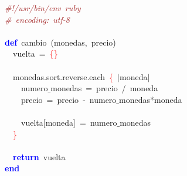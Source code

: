 \noindent
\mbox{}\textit{\textcolor{Brown}{\#!/usr/bin/env\ ruby}} \\
\mbox{}\textit{\textcolor{Brown}{\#\ encoding:\ utf-8}} \\
\mbox{} \\
\mbox{}\textbf{\textcolor{Blue}{def}}\ cambio\ \textcolor{BrickRed}{(}monedas\textcolor{BrickRed}{,}\ precio\textcolor{BrickRed}{)} \\
\mbox{}\ \ vuelta\ \textcolor{BrickRed}{=}\ \textcolor{Red}{\{\}} \\
\mbox{} \\
\mbox{}\ \ monedas\textcolor{BrickRed}{.}sort\textcolor{BrickRed}{.}reverse\textcolor{BrickRed}{.}each\ \textcolor{Red}{\{}\ \textcolor{BrickRed}{$|$}moneda\textcolor{BrickRed}{$|$} \\
\mbox{}\ \ \ \ numero$\_$monedas\ \textcolor{BrickRed}{=}\ precio\ \textcolor{BrickRed}{/}\ moneda \\
\mbox{}\ \ \ \ precio\ \textcolor{BrickRed}{=}\ precio\ \textcolor{BrickRed}{-}\ numero$\_$monedas\textcolor{BrickRed}{*}moneda \\
\mbox{} \\
\mbox{}\ \ \ \ vuelta\textcolor{BrickRed}{[}moneda\textcolor{BrickRed}{]}\ \textcolor{BrickRed}{=}\ numero$\_$monedas \\
\mbox{}\ \ \textcolor{Red}{\}} \\
\mbox{} \\
\mbox{}\ \ \textbf{\textcolor{Blue}{return}}\ vuelta \\
\mbox{}\textbf{\textcolor{Blue}{end}} \\
\mbox{}
